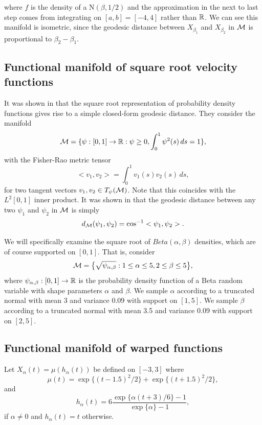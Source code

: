 \noindent where \(f\) is the density of a N\((\beta,1/2)\) and the
approximation in the next to last step comes from integrating on
\([a,b]=[-4,4]\) rather than \(\mathbb{R}\). We can see this manifold is
isometric, since the geodesic distance between \(X_{\beta_1}\) and
\(X_{\beta_2}\) in \(\mathcal{M}\) is proportional to \(\beta_2-\beta_1\).

\subsection{Functional manifold of square root velocity
functions}\label{functional-manifold-of-square-root-velocity-functions}

It was shown in \cite{Joshi2007} that the square root representation of
probability density functions gives rise to a simple closed-form
geodesic distance. They consider the manifold
\[ \mathcal{M} = \{ \psi:[0,1] \to \mathbb{R} : \psi \ge 0, \int_0^1 \psi^2(s) \,ds = 1 \},\]
with the Fisher-Rao metric tensor
\[ <v_1,v_2> = \int_0^1 v_1(s) v_2(s) \,ds ,\] for two tangent vectors
\(v_1,v_2 \in T_\psi(\mathcal{M})\). Note that this coincides with the
\(L^2[0,1]\) inner product. It was shown in \cite{Joshi2007} that the
geodesic distance between any two \(\psi_1\) and \(\psi_2\) in \(\mathcal{M}\) is
simply \[d_{\mathcal{M}}(\psi_1,\psi_2) = \cos^{-1}<\psi_1,\psi_2>.\]


We will specifically examine the square root of \(Beta(\alpha,\beta)\)
densities, which are of course supported on \([0,1]\). That is, consider
\[ \mathcal{M} = \big\{ \sqrt{\psi_{\alpha,\beta}}: 1 \le \alpha \le 5, 2 \le \beta \le 5\big\}, \]
where \(\psi_{\alpha,\beta}: [0,1] \to \mathbb{R}\) is the probability density
function of a Beta random variable with shape parameters \(\alpha\) and
\(\beta\). We sample \(\alpha\) according to a truncated normal with
mean 3 and variance 0.09 with support on \([1,5]\). We sample \(\beta\)
according to a truncated normal with mean 3.5 and variance 0.09 with
support on \([2,5]\).

\subsection{Functional manifold of warped
functions}\label{functional-manifold-of-warped-functions}

Let \(X_\alpha(t) = \mu(h_\alpha(t))\) be defined on \([-3,3]\) where
\[ \mu(t) = \exp\{(t-1.5)^2/2\}+\exp\{(t+1.5)^2/2\},\] and
\[ h_\alpha(t) = 6\frac{\exp\{\alpha(t+3)/6\}-1}{\exp\{\alpha\}-1},\] if
\(\alpha \ne 0\) and \(h_\alpha(t) = t\) otherwise.

